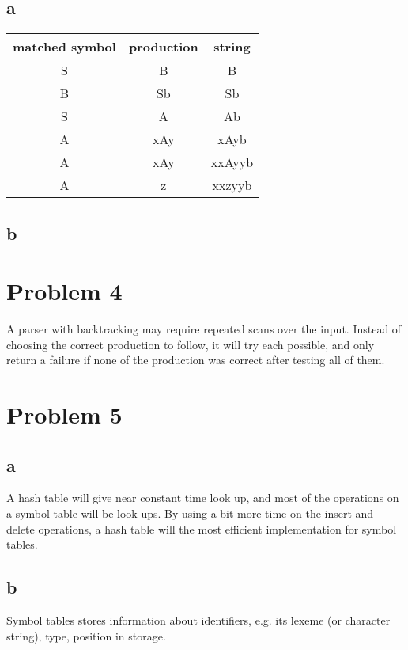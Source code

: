 \documentclass{article}
\begin{document}
\subsection*{a}
\begin{tabular}{ c | c | c}
matched symbol & production & string \\ \hline
S & B & B \\
B & Sb & Sb \\
S & A & Ab \\
A & xAy & xAyb \\
A & xAy & xxAyyb \\
A & z & xxzyyb
\end{tabular}

\subsection*{b}


\section*{Problem 4}
A parser with backtracking may require repeated scans over the input. Instead of
choosing the correct production to follow, it will try each possible, and only
return a failure if none of the production was correct after testing all of
them.

\section*{Problem 5}
\subsection*{a}
A hash table will give near constant time look up, and most of the operations on
a symbol table will be look ups. By using a bit more time on the insert and
delete operations, a hash table will the most efficient implementation for
symbol tables.

\subsection*{b}
Symbol tables stores information about identifiers, e.g. its lexeme (or
character string), type, position in storage.
\end{document}
